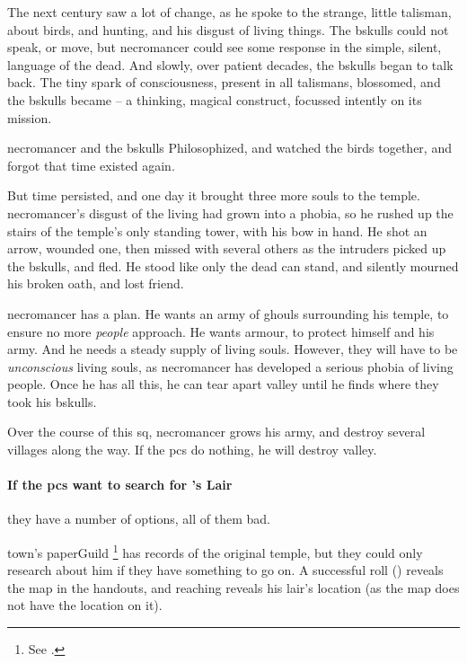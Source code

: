 \begin{exampletext}
  The next century saw a lot of change, as he spoke to the strange, little \gls{talisman}, about birds, and hunting, and his disgust of living things.
  The \gls{bskulls} could not speak, or move, but \gls{necromancer} could see some response in the simple, silent, language of the dead.
  And slowly, over patient decades, the \gls{bskulls} began to talk back.
  The tiny spark of consciousness, present in all \glspl{talisman}, blossomed, and the \gls{bskulls} became  -- a thinking, magical construct, focussed intently on its mission.

  \Gls{necromancer} and the \gls{bskulls} Philosophized, and watched the birds together, and forgot that time existed again.

  But time persisted, and one day it brought three more souls to the temple.
  \Gls{necromancer}'s disgust of the living had grown into a phobia, so he rushed up the stairs of the temple's only standing tower, with his bow in hand.
  He shot an arrow, wounded one, then missed with several others as the intruders picked up the \gls{bskulls}, and fled.
  He stood like only the dead can stand, and silently mourned his broken oath, and lost friend.
\end{exampletext}

\Gls{necromancer} has a plan.
He wants an army of ghouls surrounding his temple, to ensure no more \emph{people} approach.
He wants armour, to protect himself and his army.
And he needs a steady supply of living souls.
However, they will have to be \textit{unconscious} living souls, as \gls{necromancer} has developed a serious phobia of living people.
Once he has all this, he can tear apart \gls{valley} until he finds where they took his \gls{bskulls}.

Over the course of this \gls{sq}, \gls{necromancer} grows his army, and destroy several \glspl{village} along the way.
If the \glspl{pc} do nothing, he will destroy \gls{valley}.

\paragraph{If the \glspl{pc} want to search for 's Lair}
\label{huntingNecro}
they have a number of options, all of them bad.

\Gls{town}'s \gls{paperGuild}%
\footnote{See .}
has records of the original temple, but they could only research about him if they have something to go on.
A successful  roll (\tn[12]) reveals the map in the handouts, and reaching \tn[14] reveals his lair's location (as the map does not have the location on it).

